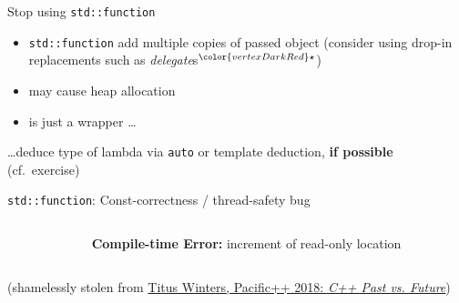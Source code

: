 \begin{frame}[fragile]{Stop using \texttt{std::function}}

    \begin{itemize}
        \item \texttt{std::function} add multiple copies of passed object (consider using drop-in replacements such as \textit{delegate}s${}^{\color{vertexDarkRed}\star}$)
        \item may cause heap allocation
        \item is just a wrapper \ldots
    \end{itemize}
    \ldots deduce type of lambda via \texttt{auto} or template deduction, \textbf{if possible} (cf.\ exercise)

    \vspace{5mm}

\end{frame}

\begin{frame}[fragile]{\texttt{std::function}: Const-correctness / thread-safety bug}
    \begin{columns}[T]
        \begin{column}{.45\textwidth}
        \end{column}
        \begin{column}{.45\textwidth}
            \textbf{Compile-time Error:} increment of read-only location
        \end{column}
    \end{columns} 

    \begin{center}
        (\footnotesize shamelessly stolen from \href{https://youtu.be/IY8tHh2LSX4}{Titus Winters, Pacific++ 2018: \textit{C++ Past vs. Future}})
    \end{center}
\end{frame}
